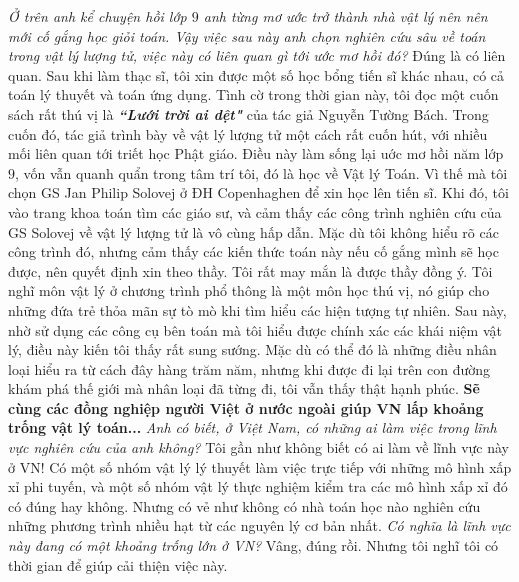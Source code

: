 \begin{multicols}{2}
	\vskip 0.1cm
	\textit{Ở trên anh kể chuyện hồi lớp $9$ anh từng mơ ước trở thành nhà vật lý nên nên mới cố gắng học giỏi toán. Vậy việc sau này anh chọn nghiên cứu sâu về toán trong vật lý lượng tử, việc này có liên quan gì tới ước mơ hồi đó?}
	\vskip 0.1cm 
	Đúng là có liên quan. Sau khi làm thạc sĩ, tôi xin được một số học bổng tiến sĩ khác nhau, có cả toán lý thuyết và toán ứng dụng. Tình cờ trong thời gian này, tôi đọc một cuốn sách rất thú vị là \textbf{\color{diendantoanhoc}\textit{``Lưới trời ai dệt"}} của tác giả Nguyễn Tường Bách. Trong cuốn đó, tác giả trình bày về vật lý lượng tử một cách rất cuốn hút, với nhiều mối liên quan tới triết học Phật giáo. Điều này làm sống lại uớc mơ hồi năm lớp $9$, vốn vẫn quanh quẩn trong tâm trí tôi, đó là học về Vật lý Toán.  
	\vskip 0.1cm
	Vì thế mà tôi chọn GS Jan Philip Solovej ở ĐH Copenhaghen để xin học lên tiến sĩ. Khi đó, tôi vào trang khoa toán tìm các giáo sư, và cảm thấy các công trình nghiên cứu của GS Solovej về vật lý lượng tử là vô cùng hấp dẫn. Mặc dù tôi không hiểu rõ các công trình đó, nhưng cảm thấy các kiến thức toán này nếu cố gắng mình sẽ học được, nên quyết định xin theo thầy. Tôi rất may mắn là được thầy đồng ý. 
	\vskip 0.1cm
	Tôi nghĩ môn vật lý ở chương trình phổ thông là một môn học thú vị, nó giúp cho những đứa trẻ thỏa mãn sự tò mò khi tìm hiểu các hiện tượng tự nhiên. Sau này, nhờ sử dụng các công cụ bên toán mà tôi hiểu được chính xác các khái niệm vật lý, điều này kiến tôi thấy rất sung sướng. Mặc dù có thể đó là những điều nhân loại hiểu ra từ cách đây hàng trăm năm, nhưng khi được đi lại trên con đường khám phá thế giới mà nhân loại đã từng đi, tôi vẫn thấy thật hạnh phúc. 
	\vskip 0.1cm
	\textbf{\color{diendantoanhoc}Sẽ cùng các đồng nghiệp người Việt ở nước ngoài giúp VN lấp khoảng trống vật lý toán...}
	\vskip 0.1cm
	\textit{Anh có biết, ở Việt Nam, có những ai làm việc trong lĩnh vực nghiên cứu của anh không?}
	\vskip 0.1cm 
	Tôi gần như không biết có ai làm về lĩnh vực này ở VN! Có một số nhóm vật lý lý thuyết làm việc trực tiếp với những mô hình xấp xỉ phi tuyến, và một số nhóm vật lý thực nghiệm kiểm tra các mô hình xấp xỉ đó có đúng hay không. Nhưng có vẻ như không có nhà toán học nào nghiên cứu những phương trình nhiều hạt từ các nguyên lý cơ bản nhất.  
	\vskip 0.1cm
	\textit{Có nghĩa là lĩnh vực này đang có một khoảng trống lớn ở VN?}
	\vskip 0.1cm 
	Vâng, đúng rồi. Nhưng tôi nghĩ tôi có thời gian để giúp cải thiện việc này. 
	\begin{figure}[H]
		\centering
		\vspace*{-5pt}
		\captionsetup{labelformat= empty, justification=centering}

\end{figure}
\end{multicols}
